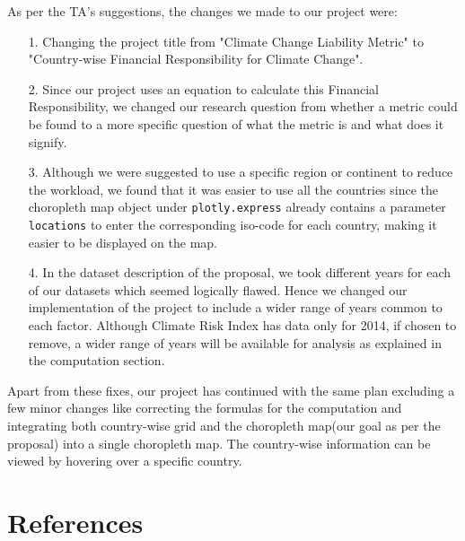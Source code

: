\documentclass[fontsize=11pt]{article}
\begin{document}
    As per the TA's suggestions, the changes we made to our project were:
    \begin{enumerate}
        \item [1.] Changing the project title from "Climate Change Liability Metric" to "Country-wise Financial
                    Responsibility for Climate Change".
        \item [2.] Since our project uses an equation to calculate this Financial Responsibility, we changed our
                    research question from whether a metric could be found to a more specific question of what the
                    metric is and what does it signify.
        \item [3.] Although we were suggested to use a specific region or continent to reduce the workload, we found
                    that it was easier to use all the countries since the choropleth map object under \texttt{plotly.express}
                    already contains a parameter \texttt{locations} to enter the corresponding iso-code for each country,
                    making it easier to be displayed on the map.
        \item [4.] In the dataset description of the proposal, we took different years for each of our datasets which seemed logically flawed.
                    Hence we changed our implementation of the project to include a wider range of years common to each
                    factor. Although Climate Risk Index has data only for 2014, if chosen to remove, a wider range of
                    years will be available for analysis as explained in the computation section.
    \end{enumerate}
    Apart from these fixes, our project has continued with the same plan excluding a few minor changes like correcting the
    formulas for the computation and integrating both country-wise grid and the choropleth map(our goal as per the proposal)
    into a single choropleth map. The country-wise information can be viewed by hovering over a specific country. \newline

    \section*{References}
\end{document}
